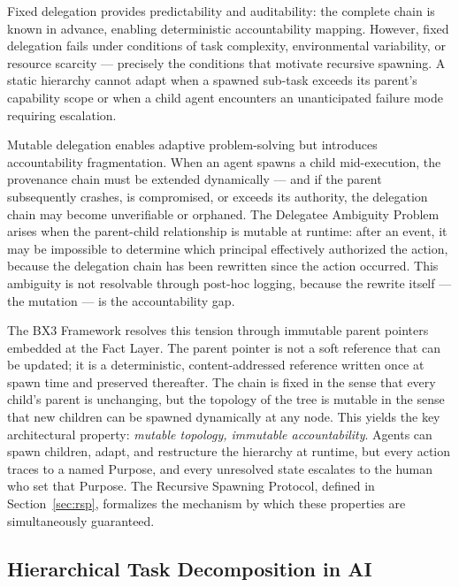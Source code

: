 Fixed delegation provides predictability and auditability: the complete chain is known in advance, enabling deterministic accountability mapping. However, fixed delegation fails under conditions of task complexity, environmental variability, or resource scarcity — precisely the conditions that motivate recursive spawning. A static hierarchy cannot adapt when a spawned sub-task exceeds its parent's capability scope or when a child agent encounters an unanticipated failure mode requiring escalation.

Mutable delegation enables adaptive problem-solving but introduces accountability fragmentation. When an agent spawns a child mid-execution, the provenance chain must be extended dynamically — and if the parent subsequently crashes, is compromised, or exceeds its authority, the delegation chain may become unverifiable or orphaned. The Delegatee Ambiguity Problem arises when the parent-child relationship is mutable at runtime: after an event, it may be impossible to determine which principal effectively authorized the action, because the delegation chain has been rewritten since the action occurred. This ambiguity is not resolvable through post-hoc logging, because the rewrite itself — the mutation — is the accountability gap.

The BX3 Framework resolves this tension through immutable parent pointers embedded at the Fact Layer. The parent pointer is not a soft reference that can be updated; it is a deterministic, content-addressed reference written once at spawn time and preserved thereafter. The chain is fixed in the sense that every child's parent is unchanging, but the topology of the tree is mutable in the sense that new children can be spawned dynamically at any node. This yields the key architectural property: \emph{mutable topology, immutable accountability}. Agents can spawn children, adapt, and restructure the hierarchy at runtime, but every action traces to a named Purpose, and every unresolved state escalates to the human who set that Purpose. The Recursive Spawning Protocol, defined in Section~\ref{sec:rsp}, formalizes the mechanism by which these properties are simultaneously guaranteed.

\subsection{Hierarchical Task Decomposition in AI}

